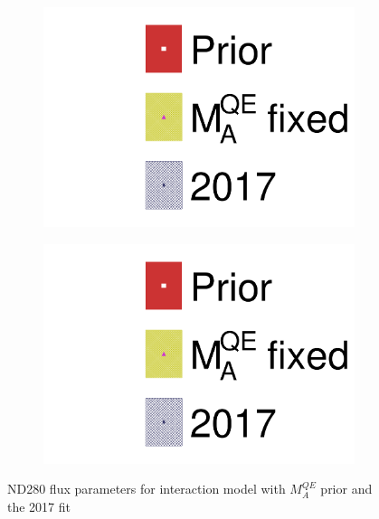\begin{figure}[h]
\begin{subfigure}[t]{0.24\textwidth}
		\includegraphics[width=\textwidth, trim={0mm 0mm 0mm 0mm}, clip,page=8]{figures/mach3/data/alt/2017b_MAQEBC_Data_merg_2017b_NewData_NewDet_UpdXsecStep_2Xsec_4Det_5Flux_0.pdf}
	\end{subfigure}
	\begin{subfigure}[t]{0.24\textwidth}
		\includegraphics[width=\textwidth, trim={0mm 0mm 0mm 0mm}, clip,page=9]{figures/mach3/data/alt/2017b_MAQEBC_Data_merg_2017b_NewData_NewDet_UpdXsecStep_2Xsec_4Det_5Flux_0.pdf}
	\end{subfigure}
	\caption{ND280 flux parameters for interaction model with $M_A^{QE}$ prior and the 2017 fit}
	\label{fig:maqe_prior_flux}
\end{figure}

